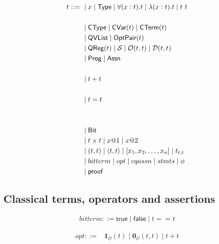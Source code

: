 \newcommand{\ONEO}{\ensuremath{\mathbf{1}_\mathcal{O}}}
\newcommand{\ZEROO}{\ensuremath{\mathbf{0}_\mathcal{O}}}

\newcommand{\true}{\textsf{true}}
\newcommand{\false}{\textsf{false}}

\begin{definition}
    \begin{align*}
        t ::=\ & \mid x \mid \textsf{Type} \mid \forall (x : t). t \mid \lambda (x : t). t \mid t\ t\\
        \\
        & \mid \textsf{CType} \mid \textsf{CVar}(t) \mid \textsf{CTerm}(t) \\
        & \mid \textsf{QVList} \mid \textsf{OptPair}(t) \\
        & \mid \textsf{QReg}(t) \mid \mathcal{S} \mid \mathcal{O}(t, t) \mid \mathcal{D}(t, t) \\
        & \mid \textsf{Prog} \mid \textsf{Assn} \\
        \\
        & \mid t + t \\
        \\
        & \mid t = t \\
        \\
        \\
        & \mid \textsf{Bit} \\
        & \mid t \times t \mid  x@1 \mid x@2 \\ 
        & \mid (t, t) \mid \langle t, t \rangle \mid [x_1, x_2, \dots, x_n] \mid t_{t,t} \\
        & \mid bitterm \mid opt \mid cqassn \mid stmts \mid \phi \\
        & \mid \textsf{proof}
    \end{align*}
\end{definition}

\subsection{Classical terms, operators and assertions}

\begin{definition}
    \begin{align*}
        bitterm ::= \true \mid \false \mid t == t
    \end{align*}
\end{definition}

\begin{definition}
    \begin{align*}
        opt ::= & \ONEO(t) \mid \ZEROO(t,t) \mid t + t
    \end{align*}
\end{definition}

